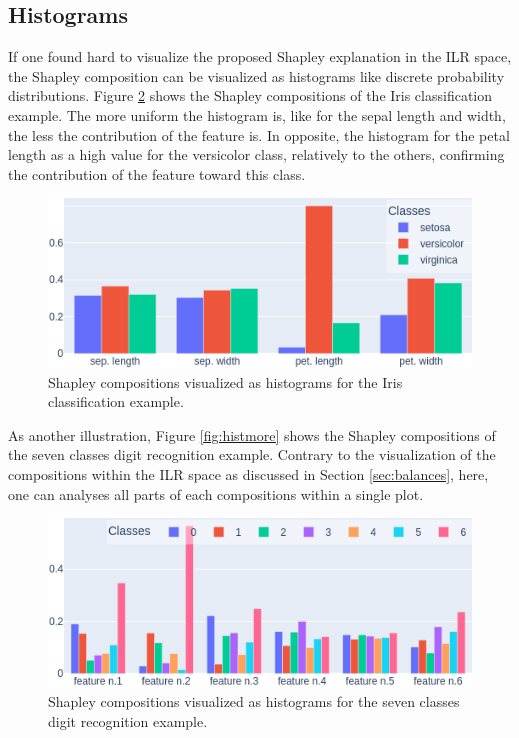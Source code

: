 \documentclass{article}
\theoremstyle{plain}
\theoremstyle{definition}
\theoremstyle{remark}
\begin{document}
\subsection{Histograms}

If one found hard to visualize the proposed Shapley explanation in the ILR space, the Shapley composition can be visualized as histograms like discrete probability distributions. Figure \ref{fig:histiris} shows the Shapley compositions of the Iris classification example. The more uniform the histogram is, like for the sepal length and width, the less the contribution of the feature is. In opposite, the histogram for the petal length as a high value for the versicolor class, relatively to the others, confirming the contribution of the feature toward this class.
\begin{figure}
  \centering
  \includegraphics[width=\linewidth]{figures/3classes/histo}
  \caption{Shapley compositions visualized as histograms for the Iris classification example.}
  \label{fig:histiris}
\end{figure}
As another illustration, Figure \ref{fig:histmore} shows the Shapley compositions of the seven classes digit recognition example. Contrary to the visualization of the compositions within the ILR space as discussed in Section \ref{sec:balances}, here, one can analyses all parts of each compositions within a single plot.
\begin{figure}
  \centering
  \includegraphics[width=\linewidth]{figures/moreclasses/histo}
  \caption{Shapley compositions visualized as histograms for the seven classes digit recognition example.}
  \label{fig:histiris}
\end{figure}
\end{document}
